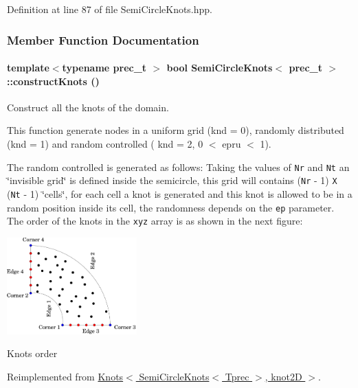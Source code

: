 Definition at line 87 of file SemiCircleKnots.hpp.

\subsubsection{Member Function Documentation}
\hypertarget{classSemiCircleKnots_af1e7ded0e5a9ed35d61a1ae63621b6d}{
\paragraph[{constructKnots}]{\setlength{\rightskip}{0pt plus 5cm}template$<$typename prec\_\-t $>$ bool {\bf SemiCircleKnots}$<$ prec\_\-t $>$::constructKnots ()}\hfill}
\label{classSemiCircleKnots_af1e7ded0e5a9ed35d61a1ae63621b6d}


Construct all the knots of the domain. 

This function generate nodes in a uniform grid (knd = 0), randomly distributed (knd = 1) and random controlled ( knd = 2, 0 $<$ epru $<$ 1).

The random controlled is generated as follows: Taking the values of {\tt Nr} and {\tt Nt} an \char`\"{}invisible grid\char`\"{} is defined inside the semicircle, this grid will contains ({\tt Nr} - 1) {\tt X} ({\tt Nt} - 1) \char`\"{}cells\char`\"{}, for each cell a knot is generated and this knot is allowed to be in a random position inside its cell, the randomness depends on the {\tt ep} parameter. The order of the knots in the {\tt xyz} array is as shown in the next figure:  \begin{Image}
\begin{center}
\includegraphics[width=5cm]{SemiCircleKnots}\caption{Knots order}
\end{center}
\end{Image}
 

Reimplemented from \hyperlink{classKnots_8e622932aee837d4c3465093f3158ebb}{Knots$<$ SemiCircleKnots$<$ Tprec $>$, knot2D $>$}.


